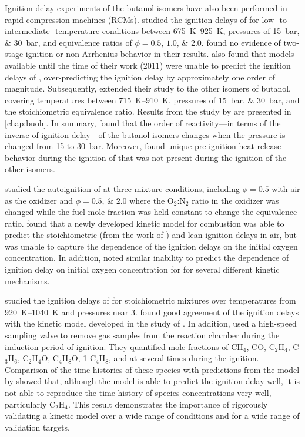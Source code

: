 \documentclass[../main.tex]{subfiles}
\begin{document}
Ignition delay experiments of the butanol isomers have also been
performed in rapid compression machines (RCMs). \textcite{Weber2011}
studied the ignition delays of \nBuOH{} for low- to intermediate-%
temperature conditions between \SIrange{675}{925}{\kelvin}, pressures of
\SIlist{15;30}{\bar}, and equivalence ratios of $\phi = \numlist{0.5;1.0;2.0}$.
\textcite{Weber2011} found no evidence of two-stage ignition or
non-Arrhenius behavior in their results. \textcite{Weber2011} also found
that models available until the time of their work (2011) were unable
to predict the ignition delays of \nBuOH{}, over-predicting
the ignition delay by approximately one order of magnitude. Subsequently,
\textcite{Weber2013} extended their study to the other isomers of
butanol, covering temperatures between \SIrange{715}{910}{\kelvin},
pressures of \SIlist{15;30}{\bar}, and the stoichiometric equivalence
ratio. Results from the study by \textcite{Weber2013} are presented in
\cref{chap:buoh}. In summary, \textcite{Weber2013} found that the order of
reactivity---in terms of the inverse of ignition delay---of the butanol
isomers changes when the pressure is changed from \num{15} to \SI{30}{\bar}.
Moreover, \textcite{Weber2013} found unique pre-ignition heat release
behavior during the ignition of \tBuOH{} that was not present
during the ignition of the other isomers.

\textcite{Weber2013a} studied the autoignition of \iBuOH{}
at three mixture conditions, including $\phi = 0.5$ with air as the
oxidizer and $\phi = \numlist{0.5;2.0}$ where the O$_2$:N$_2$
ratio in the oxidizer was changed while the fuel mole fraction was held constant
to change the equivalence ratio. \textcite{Weber2013a} found that
a newly developed kinetic model for \iBuOH{} combustion
was able to predict the stoichiometric (from the work of \textcite{Weber2013})
and lean ignition delays in air, but was unable to capture the
dependence of the ignition delays on the initial oxygen concentration.
In addition, \textcite{Weber2011, Zhu2014} noted similar inability to predict
the dependence of ignition delay on initial oxygen concentration for
\nBuOH{} for several different kinetic mechanisms.

\textcite{Karwat2011a} studied the ignition delays of \nBuOH{}
for stoichiometric mixtures over temperatures from \SIrange{920}{1040}{\kelvin}
and pressures near \SI{3}{\atmosphere}. \textcite{Karwat2011a} found good
agreement of the ignition delays with the kinetic model developed in the
study of \textcite{Black2010}. In addition, \textcite{Karwat2011a} used
a high-speed sampling valve to remove gas samples from the reaction chamber
during the induction period of \nBuOH{} ignition. They quantified
mole fractions of CH$_4$, CO, C$_2$H$_4$, C$_3$H$_6$, C$_2$H$_4$O, C$_4$H$_8$O,
1-C$_4$H$_8$, and \nBuOH{} at several times during the ignition.
Comparison of the time histories of these species with predictions from
the model by \textcite{Black2010} showed that, although the model is able
to predict the ignition delay well, it is not able to reproduce the time history
of species concentrations very well, particularly C$_2$H$_4$. This result
demonstrates the importance of rigorously validating a kinetic model over
a wide range of conditions and for a wide range of validation targets.
\end{document}

